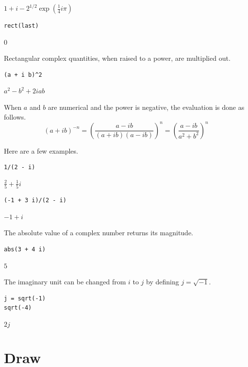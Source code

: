 \documentclass[12pt]{article}
\begin{document}
$\displaystyle 1+i-2^{1/2}\exp\left(\tfrac{1}{4}i\pi\right)$

{\color{blue}
\begin{verbatim}
rect(last)
\end{verbatim}
}

$\displaystyle 0$

\bigskip

Rectangular complex quantities, when raised to a power, are multiplied out.

{\color{blue}
\begin{verbatim}
(a + i b)^2
\end{verbatim}
}

$\displaystyle a^2-b^2+2iab$

\bigskip

When $a$ and $b$ are numerical and the power is negative, the evaluation is done as follows.
\begin{equation*}
(a+ib)^{-n}
=\left(\frac{a-ib}{(a+ib)(a-ib)}\right)^n=
\left(\frac{a-ib}{a^2+b^2}\right)^n
\end{equation*}

Here are a few examples.

{\color{blue}
\begin{verbatim}
1/(2 - i)
\end{verbatim}
}

$\displaystyle \tfrac{2}{5}+\tfrac{1}{5}i$

{\color{blue}
\begin{verbatim}
(-1 + 3 i)/(2 - i)
\end{verbatim}
}

$\displaystyle -1+i$

\bigskip

The absolute value of a complex number returns its magnitude.

{\color{blue}
\begin{verbatim}
abs(3 + 4 i)
\end{verbatim}
}

$\displaystyle 5$

\bigskip

The imaginary unit can be changed from $i$ to $j$
by defining $j=\sqrt{-1}$.

{\color{blue}
\begin{verbatim}
j = sqrt(-1)
sqrt(-4)
\end{verbatim}
}

$\displaystyle 2j$

\newpage

\section{Draw}
\end{document}
